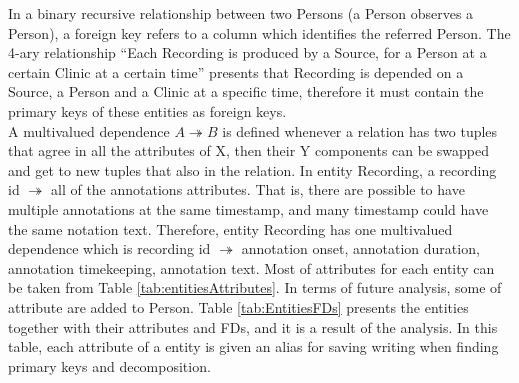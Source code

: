 In a binary recursive relationship between two Persons (a Person observes a Person), a foreign key refers to a column which identifies the referred Person. The 4-ary relationship “Each Recording is produced by a Source, for a Person at a certain Clinic at a certain time” presents that Recording is depended on a Source, a Person and a Clinic at a specific time, therefore it must contain the primary keys of these entities as foreign keys.\\
A multivalued dependence $A \twoheadrightarrow B$ is defined whenever a relation has two tuples that agree in all the attributes of X, then their Y components can be swapped and get to new tuples that also in the relation. In entity Recording, a recording id $\twoheadrightarrow$ all of the annotations attributes. That is, there are possible to have multiple annotations at the same timestamp, and many timestamp could have the same notation text. Therefore, entity Recording has one multivalued dependence which is recording id $\twoheadrightarrow$ annotation onset, annotation duration, annotation timekeeping, annotation text.
Most of attributes for each entity can be taken from Table \ref{tab:entitiesAttributes}. In terms of future analysis, some of attribute are added to Person. Table \ref{tab:EntitiesFDs} presents the entities together with their attributes and FDs, and it is a result of the analysis. In this table, each attribute of a entity is given an alias for saving writing when finding primary keys and decomposition.
